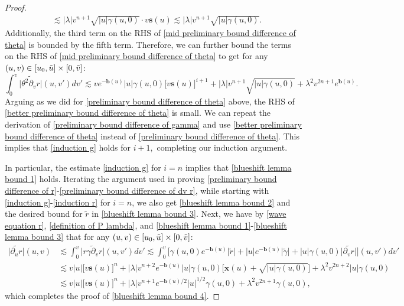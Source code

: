 \documentclass[11pt]{article}
\numberwithin{equation}{section}
\begin{document}
\begin{proof}
\begin{align}
        &\lesssim|\lambda| v^{n+1}\sqrt{|u|\gamma(u,0)}\cdot v\mathbf{s}(u)\lesssim|\lambda| v^{n+1}\sqrt{|u|\gamma(u,0)}.
    \end{align}
    Additionally, the third term on the RHS of \eqref{mid preliminary bound difference of theta} is bounded by the fifth term. Therefore, we can further bound the terms on the RHS of \eqref{mid preliminary bound difference of theta} to get for any $(u,v)\in[u_0,\Tilde{u}]\times[0,\Tilde{v}]$:
    \begin{equation}\label{better preliminary bound difference of theta}
        \int_0^v\big|\widetilde{\theta^2\partial_vr}\big|(u,v')dv'\lesssim ve^{-\mathbf{b}(u)}|u|\gamma(u,0)\big[v\mathbf{s}(u)\big]^{i+1}+|\lambda| v^{n+1}\sqrt{|u|\gamma(u,0)}+\lambda^2v^{2n+1}e^{\mathbf{b}(u)}.
    \end{equation}
    Arguing as we did for \eqref{preliminary bound difference of theta} above, the RHS of \eqref{better preliminary bound difference of theta} is small. We can repeat the derivation of \eqref{preliminary bound difference of gamma} and use \eqref{better preliminary bound difference of theta} instead of \eqref{preliminary bound difference of theta}. This implies that \eqref{induction g} holds for $i+1,$ completing our induction argument. 

    In particular, the estimate \eqref{induction g} for $i=n$ implies that \eqref{blueshift lemma bound 1} holds. Iterating the argument used in proving \eqref{preliminary bound difference of r}-\eqref{preliminary bound difference of dv r}, while starting with \eqref{induction g}-\eqref{induction r} for $i=n$, we also get \eqref{blueshift lemma bound 2} and the desired bound for $\widetilde{r}$ in \eqref{blueshift lemma bound 3}. Next, we have by \eqref{wave equation r}, \eqref{definition of P lambda}, and \eqref{blueshift lemma bound 1}-\eqref{blueshift lemma bound 3} that for any $(u,v)\in[u_0,\Tilde{u}]\times[0,\Tilde{v}]$:
    \begin{align*}
        \big|\widetilde{\partial_ur}\big|(u,v)&\lesssim\int_{0}^v\big|\widetilde{r\gamma\partial_vr}\big|(u,v')dv'\lesssim\int_{0}^v\bigg[\gamma(u,0)e^{-\mathbf{b}(u)}\big|\widetilde{r}\big|+|u|e^{-\mathbf{b}(u)}\big|\widetilde{\gamma}\big|+|u|\gamma(u,0)\big|\widetilde{\partial_vr}\big|\bigg](u,v')dv'\\
        &\lesssim v|u|\big[v\mathbf{s}(u)\big]^{n}+|\lambda|v^{n+2}e^{-\mathbf{b}(u)}|u|\gamma(u,0)\Big[\mathbf{x}(u)+\sqrt{|u|\gamma(u,0)}\Big]+\lambda^2 v^{2n+2}|u|\gamma(u,0)\\
        &\lesssim v|u|\big[v\mathbf{s}(u)\big]^{n}+|\lambda|v^{n+1}e^{-\mathbf{b}(u)/2}|u|^{1/2}\gamma(u,0)+\lambda^2 v^{2n+1}\gamma(u,0),
    \end{align*}
    which completes the proof of \eqref{blueshift lemma bound 4}. 


\end{proof}
\end{document}
